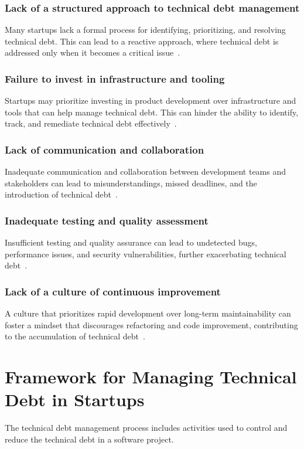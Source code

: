 \subsubsection{Lack of a structured approach to technical debt management} 
Many startups lack a formal process for identifying, prioritizing, and resolving technical debt. This can lead to a reactive approach, where technical debt is addressed only when it becomes a critical issue~\cite{FowlerBottlenecks}.

\subsubsection{Failure to invest in infrastructure and tooling} 
Startups may prioritize investing in product development over infrastructure and tools that can help manage technical debt. This can hinder the ability to identify, track, and remediate technical debt effectively~\cite{Blog21:online,Totalqua26:online}.

\subsubsection{Lack of communication and collaboration}
Inadequate communication and collaboration between development teams and stakeholders can lead to misunderstandings, missed deadlines, and the introduction of technical debt~\cite{Whopayso60:online,TheTop5S17:online}.

\subsubsection{Inadequate testing and quality assessment}
Insufficient testing and quality assurance can lead to undetected bugs, performance issues, and security vulnerabilities, further exacerbating technical debt~\cite{HowtoGet43:online}.

\subsubsection{Lack of a culture of continuous improvement}
A culture that prioritizes rapid development over long-term maintainability can foster a mindset that discourages refactoring and code improvement, contributing to the accumulation of technical debt~\cite{FowlerBottlenecks,Whopayso60:online}.



\section{Framework for Managing Technical Debt in Startups} \label{Sec:Framework}
The technical debt management process includes activities used to control and reduce the technical debt in a software project.

